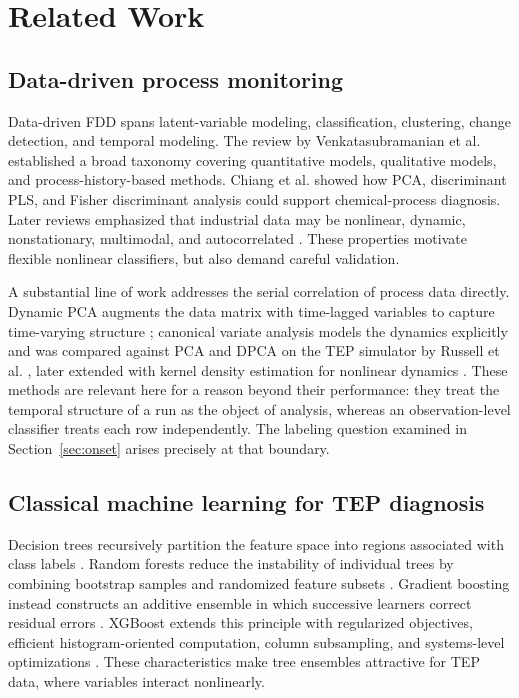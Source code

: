 \documentclass[12pt,a4paper]{article}
\begin{document}
\section{Related Work}

\subsection{Data-driven process monitoring}

Data-driven FDD spans latent-variable modeling, classification, clustering,
change detection, and temporal modeling. The review by Venkatasubramanian et
al. \cite{venkatasubramanian2003review} established a broad taxonomy covering
quantitative models, qualitative models, and process-history-based methods.
Chiang et al. \cite{chiang2000discriminant,chiang2001book} showed how PCA,
discriminant PLS, and Fisher discriminant analysis could support chemical-process
diagnosis. Later reviews emphasized that industrial data may be nonlinear,
dynamic, nonstationary, multimodal, and autocorrelated
\cite{yin2014review,ji2022review}. These properties motivate flexible nonlinear
classifiers, but also demand careful validation.

A substantial line of work addresses the serial correlation of process data
directly. Dynamic PCA augments the data matrix with time-lagged variables to
capture time-varying structure \cite{ku1995dpca}; canonical variate analysis
models the dynamics explicitly and was compared against PCA and DPCA on the TEP
simulator by Russell et al. \cite{russell2000cva}, later extended with kernel
density estimation for nonlinear dynamics \cite{odiowei2010cva}. These methods
are relevant here for a reason beyond their performance: they treat the
temporal structure of a run as the object of analysis, whereas an
observation-level classifier treats each row independently. The labeling
question examined in Section~\ref{sec:onset} arises precisely at that
boundary.

\subsection{Classical machine learning for TEP diagnosis}

Decision trees recursively partition the feature space into regions associated
with class labels \cite{breiman1984cart}. Random forests reduce the instability
of individual trees by combining bootstrap samples and randomized feature
subsets \cite{breiman2001rf}. Gradient boosting instead constructs an additive
ensemble in which successive learners correct residual errors
\cite{friedman2001gbm}. XGBoost extends this principle with regularized
objectives, efficient histogram-oriented computation, column subsampling, and
systems-level optimizations \cite{chen2016xgboost}. These characteristics make
tree ensembles attractive for TEP data, where variables interact nonlinearly.
\end{document}
